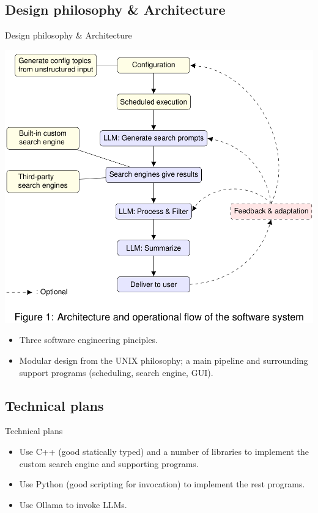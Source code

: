 \documentclass{beamer}
\begin{document}
\subsection{Design philosophy \& Architecture}
\begin{frame}{Design philosophy \& Architecture}
	\begin{center}
		\includegraphics[height=.6\textheight]{./architecture.png}
	\end{center}
	\begin{itemize}
		\item Three software engineering pinciples.
		\item Modular design from the UNIX philosophy; a main pipeline and
			surrounding support programs (scheduling, search engine, GUI).
	\end{itemize}

\end{frame}

\subsection{Technical plans}
\begin{frame}{Technical plans}
	\begin{itemize}
		\item Use C++ (good statically typed) and a number of libraries to
			implement the custom search engine and supporting programs.
		\item Use Python (good scripting for invocation) to implement the rest
			programs.
		\item Use Ollama to invoke LLMs. 
	\end{itemize}
\end{frame}
\end{document}
